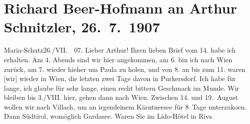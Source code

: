 

         
         \renewcommand{\erwaehntePersonen}{Personen: Richard Beer-Hofmann, Paula Beer-Hofmann, Olga Schnitzler, Heinrich Schnitzler}
         \renewcommand{\erwaehnteOrte}{Orte: Bozen, Große Dolomitenstraße, Hotel du Lac, Kärnten, Lago di Garda, Maria Schutz, Palast Hotel Lido, Purkersdorf, Riva del Garda, Südtirol, Torbole sul Garda, Villach, Welsberg-Taisten, Wien}
         \renewcommand{\erwaehnteWerke}{}
               \section[Richard Beer-Hofmann an Arthur Schnitzler, 26. 7. 1907]{ Richard Beer-Hofmann an Arthur Schnitzler, 26. 7. 1907}\nopagebreak{}\rehead{ }\begin{ledgroupsized}[t]{13cm}\normalsize\beginnumbering{} \toendnotes[C]{\smallbreak\pagebreak[2]} 
\pstart
           \raggedleft{}{\pb}Maria-Schutz26./VII.  07.\pend
           \pstart
           Lieber Arthur! Ihren lieben Brief vom 14. habe ich
               erhalten. Am 4. Abends sind wir hier angekommen, am 6. bin
               ich nach Wien zurück, am 7. wieder
               hieher um Paula zu holen, und von
                  8. an bis zum 11. waren {[}wir{]} wieder
               in Wien, die letzten zwei Tage davon in Purkersdorf. Ich habe für lange, ich glaube für
               sehr lange, einen recht bittern Geschmack im Munde.\pend
           \pstart
           Wir bleiben bis 3./VIII. hier, gehen dann nach Wien. Zwischen 14. und 19. August
               wollen wir {\pb}nach Villach, um an irgendeinem Kärntnersee für 8 Tage unterzuko{\geminationm}en. Dann Südtirol, womöglich Gardasee. Waren Sie im Lido-Hôtel in Riva

\end{ledgroupsized}
